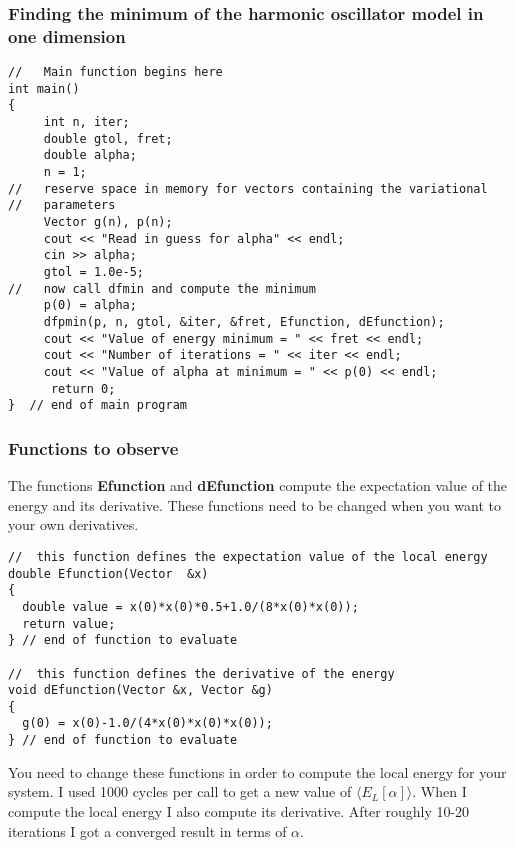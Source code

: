 \documentclass{beamer}
\begin{document}
\begin{frame}
\frametitle{Finding the minimum of the harmonic oscillator model in one dimension}

\begin{block}{}
\begin{verbatim}
//   Main function begins here
int main()
{
     int n, iter;
     double gtol, fret;
     double alpha;
     n = 1;
//   reserve space in memory for vectors containing the variational
//   parameters
     Vector g(n), p(n);
     cout << "Read in guess for alpha" << endl;
     cin >> alpha;
     gtol = 1.0e-5;
//   now call dfmin and compute the minimum
     p(0) = alpha;
     dfpmin(p, n, gtol, &iter, &fret, Efunction, dEfunction);
     cout << "Value of energy minimum = " << fret << endl;
     cout << "Number of iterations = " << iter << endl;
     cout << "Value of alpha at minimum = " << p(0) << endl;
      return 0;
}  // end of main program

\end{verbatim}
\end{block}
\end{frame}

\begin{frame}
\frametitle{Functions to observe}

\begin{block}{}
The functions \textbf{Efunction} and \textbf{dEfunction} compute the expectation value of the energy and its derivative.
These functions need to be changed when you want to your own derivatives.
\begin{verbatim}
//  this function defines the expectation value of the local energy
double Efunction(Vector  &x)
{
  double value = x(0)*x(0)*0.5+1.0/(8*x(0)*x(0));
  return value;
} // end of function to evaluate

//  this function defines the derivative of the energy 
void dEfunction(Vector &x, Vector &g)
{
  g(0) = x(0)-1.0/(4*x(0)*x(0)*x(0));
} // end of function to evaluate
\end{verbatim}
You need to change these functions in order to compute the local energy for your system. I used 1000
cycles per call to get a new value of $\langle E_L[\alpha]\rangle$.
When I compute the local energy I also compute its derivative.
After roughly 10-20 iterations I got a converged result in terms of $\alpha$.
\end{block}
\end{frame}
\end{document}
